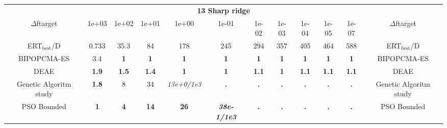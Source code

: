 \begin{tabular}{cccccccccccc}
 & \multicolumn{10}{c}{{\normalsize \textbf{13 Sharp ridge}}}\\
$\Delta$ftarget& 1e+03& 1e+02& 1e+01& 1e+00& 1e-01& 1e-02& 1e-03& 1e-04& 1e-05& 1e-07 & $\Delta$ftarget \\
ERT$_{\textrm{best}}$/D& 0.733& 35.3& 84& 178& 245& 294& 357& 405& 464& 588 & ERT$_{\textrm{best}}$/D \\
\hline
BIPOPCMA-ES & 3.4 & \textbf{1} & \textbf{1} & \textbf{1} & \textbf{1} & \textbf{1} & \textbf{1} & \textbf{1} & \textbf{1} & \textbf{1} & BIPOPCMA-ES \cite{add_an_entry_for_BIPOPCMA-ES_in_bbob.bib}\\
DEAE & \textbf{1.9} & \textbf{1.5} & \textbf{1.4} & \textbf{1} & \textbf{1} & \textbf{1.1} & \textbf{1} & \textbf{1.1} & \textbf{1.1} & \textbf{1.1} & DEAE \cite{add_an_entry_for_DEAE_in_bbob.bib}\\
Genetic Algoritm study & \textbf{1.8} & 8 & 34 & \textit{13e+0}\textit{/1e3} & \textbf{.} & \textbf{.} & \textbf{.} & \textbf{.} & \textbf{.} & \textbf{.} & Genetic Algoritm study \cite{add_an_entry_for_Genetic Algoritm study_in_bbob.bib}\\
PSO Bounded & \textbf{1} & \textbf{4} & \textbf{14} & \textbf{26} & \textbf{\textit{38e-1}\textit{/1e3}} & \textbf{.} & \textbf{.} & \textbf{.} & \textbf{.} & \textbf{.} & PSO Bounded \cite{add_an_entry_for_PSO Bounded_in_bbob.bib}
\end{tabular}
